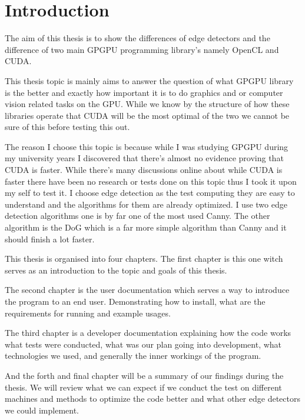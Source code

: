 \chapter{Introduction}

The aim of this thesis is to show the differences of edge detectors and the difference of two main \ac{GPGPU} programming library's namely OpenCL and CUDA.

This thesis 	topic is mainly aims to answer the question of what \ac{GPGPU} library is the better and exactly how important it is to do graphics and or computer vision related tasks on the \ac{GPU}. While we know by the structure of how these libraries operate that CUDA will be the most optimal of the two we cannot be sure of this before testing this out.

The reason I choose this topic is because while I was studying \ac{GPGPU} during my university years I discovered that there's almost no evidence proving that CUDA is faster. While there's many discussions online about while CUDA is faster there have been no research or tests done on this topic thus I took it upon my self to test it. I choose edge detection as the test computing they are easy to understand and the algorithms for them are already optimized. I use two edge detection algorithms one is by far one of the most used \ac{Canny}. The other algorithm is the \ac{DoG} which is a far more simple algorithm than \ac{Canny} and it should finish a lot faster.

This thesis is organised into four chapters. The first chapter is this one witch serves as an introduction to the topic and goals of this thesis.

The second chapter is the user documentation which serves a way to introduce the program to an end user. Demonstrating how to install, what are the requirements for running and example usages.

The third chapter is a developer documentation explaining how the code works what tests were conducted, what was our plan going into development, what technologies we used, and generally the inner workings of the program.

And the forth and final chapter will be a summary of our findings during the thesis. We will review what we can expect if we conduct the test on different machines and methods to optimize the code better and what other edge detectors we could implement.